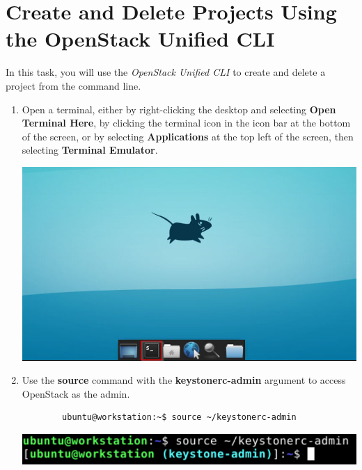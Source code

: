 \documentclass[letterpaper, 12pt]{article}
\begin{document}
\section{Create and Delete Projects Using the OpenStack Unified CLI}
\label{sec:create_and_delete_projects_using_the_openstack_unified_cli}
In this task, you will use the \textit{OpenStack Unified CLI} to create and delete a project from the command line.

\begin{enumerate}    
    \item Open a terminal, either by right-clicking the desktop and selecting \textbf{Open Terminal Here}, by clicking
    the terminal icon in the icon bar at the bottom of the screen, or by selecting \textbf{Applications} at the top
    left of the screen, then selecting \textbf{Terminal Emulator}.

    \begin{center}
        \includegraphics[width=\linewidth]{images/part2/step1.png}
    \end{center}

    \item Use the \textbf{source} command with the \textbf{keystonerc-admin} argument to access OpenStack as the admin.
    \begin{lstlisting}
        ubuntu@workstation:~$ source ~/keystonerc-admin
    \end{lstlisting}
    
    \begin{center}
        \includegraphics[width=\linewidth]{images/part2/step2.png}
    \end{center}


\end{enumerate}
\end{document}

